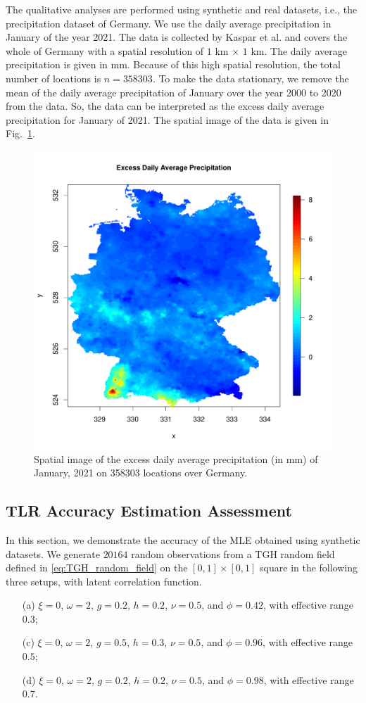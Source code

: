 \documentclass[conference]{IEEEtran}
\begin{document}
The qualitative analyses are performed using synthetic and real datasets, i.e., the precipitation dataset of Germany. We use the daily average precipitation in January of the year 2021. The data is collected by Kaspar et al. \cite{kaspar2013monitoring} and covers the whole of Germany with a spatial resolution of $1$ km $\times$ $1$ km. The daily average precipitation is given in mm. Because of this high spatial resolution, the total number of locations is $n = 358303$. To make the data stationary, we remove the mean of the daily average precipitation of January over the year 2000 to 2020 from the data. So, the data can be interpreted as the excess daily average precipitation for January of 2021. The spatial image of the data is given in Fig.~\ref{fig:data_image}.
\begin{figure}[h]
\centering
\includegraphics[width=0.55\linewidth]{./figures/data_spatial_image.pdf}
  \caption{Spatial image of the excess daily average precipitation (in mm) of January, 2021 on 358303 locations over Germany.
}
  \label{fig:data_image}
\end{figure}

\subsection{TLR Accuracy Estimation Assessment}
In this section, we demonstrate the accuracy of the MLE obtained using synthetic datasets. We generate $20164$ random observations from a TGH random field defined in \eqref{eq:TGH_random_field} on the  $[0,1]\times[0,1]$ square in the following three setups, with latent correlation function.
\begin{enumerate}
\item[(a)] $\xi = 0$, $\omega = 2$, $g = 0.2$, $h = 0.2$, $\nu = 0.5$, and $\phi = 0.42$, with effective range $0.3$;
\item[(c)] $\xi = 0$, $\omega = 2$, $g = 0.5$, $h = 0.3$, $\nu = 0.5$, and $\phi = 0.96$, with effective range $0.5$;
\item[(d)] $\xi = 0$, $\omega = 2$, $g = 0.2$, $h = 0.2$, $\nu = 0.5$, and $\phi = 0.98$, with effective range $0.7$.
\end{enumerate}
\end{document}
